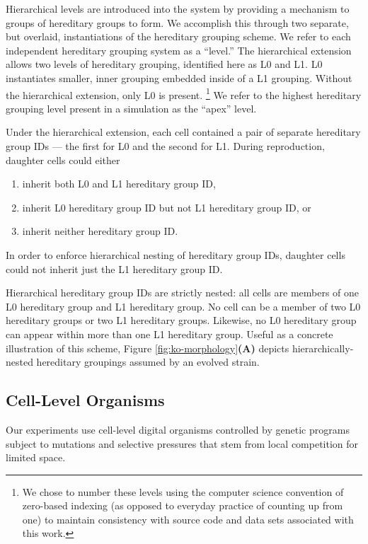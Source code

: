 Hierarchical levels are introduced into the system by providing a mechanism to groups of hereditary groups to form.
We accomplish this through two separate, but overlaid, instantiations of the hereditary grouping scheme.
We refer to each independent hereditary grouping system as a ``level.''
The hierarchical extension allows two levels of hereditary grouping, identified here as L0 and L1.
L0 instantiates smaller, inner grouping embedded inside of a L1 grouping.
Without the hierarchical extension, only L0 is present.%
\footnote{%
We chose to number these levels using the computer science convention of zero-based indexing (as opposed to everyday practice of counting up from one) to maintain consistency with source code and data sets associated with this work.
}
We refer to the highest hereditary grouping level present in a simulation as the ``apex'' level.

Under the hierarchical extension, each cell contained a pair of separate hereditary group IDs --- the first for L0 and the second for L1.
During reproduction, daughter cells could either
\begin{enumerate}
\item inherit both L0 and L1 hereditary group ID,
\item inherit L0 hereditary group ID but not L1 hereditary group ID, or
\item inherit neither hereditary group ID.
\end{enumerate}
In order to enforce hierarchical nesting of hereditary group IDs, daughter cells could not inherit just the L1 hereditary group ID.

Hierarchical hereditary group IDs are strictly nested: all cells are members of one L0 hereditary group and L1 hereditary group.
No cell can be a member of two L0 hereditary groups or two L1 hereditary groups.
Likewise, no L0 hereditary group can appear within more than one L1 hereditary group.
Useful as a concrete illustration of this scheme, Figure \ref{fig:ko-morphology}\textbf{(A)} depicts hierarchically-nested hereditary groupings assumed by an evolved strain.

\subsection{Cell-Level Organisms}

Our experiments use cell-level digital organisms controlled by genetic programs subject to mutations and selective pressures that stem from local competition for limited space.

